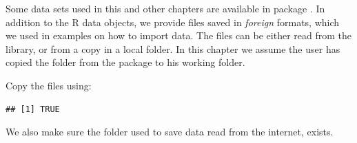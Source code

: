 \documentclass[krantz2]{krantz}\usepackage{knitr}%
\begin{document}
\begin{knitrout}\footnotesize
{}\color{fgcolor}\begin{kframe}
\begin{alltt}
\end{alltt}
\end{kframe}
\end{knitrout}

\begin{infobox}
Some data sets used in this and other chapters are available in package . In addition to the
R data objects, we provide files saved in \emph{foreign} formats, which we used in examples on how to import data. The files can be either read from the \Rlang library, or from a copy in a local folder. In this chapter we
assume the user has copied the folder  from the package to his working folder.

Copy the files using:

\begin{knitrout}\footnotesize
{}\color{fgcolor}\begin{kframe}
\begin{alltt}
 \hlkwb{<-} \hlstd{(}\hlstd{,}  \hlstd{=} \hlstd{)}
 \hlstd{,}  \hlstd{=} \hlstd{,}  \hlstd{=} \hlstd{)}
\end{alltt}
\begin{verbatim}
## [1] TRUE
\end{verbatim}
\end{kframe}
\end{knitrout}

We also make sure the folder used to save data read from the internet, exists.

\begin{knitrout}\footnotesize
{}\color{fgcolor}\begin{kframe}
\begin{alltt}
 \hlkwb{=} 
 \hlstd{(}\hlopt{!}
\hlstd{\}}
\end{alltt}
\end{kframe}
\end{knitrout}
\end{infobox}
\end{document}
